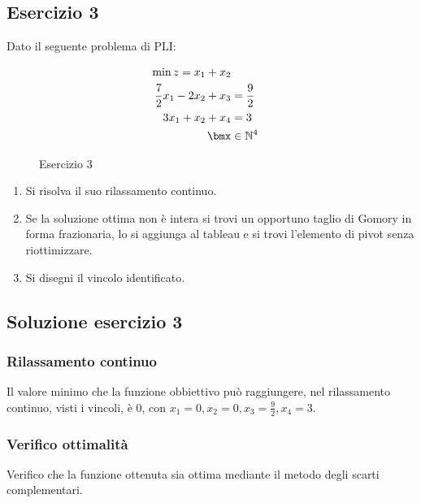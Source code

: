 \documentclass[\main/main.tex]{subfiles}
\begin{document}
\subsection{Esercizio 3}
Dato il seguente problema di PLI:

\begin{figure}
  \begin{align*}
    \min z = x_1 + x_2                             \\
    \frac{7}{2}x_1 - 2x_2 + x_3 & = \frac{9}{2}    \\
    3x_1 + x_2 + x_4            & = 3              \\
    \bmx                        & \in \mathbb{N}^4
  \end{align*}
  \caption{Esercizio 3}
\end{figure}

\begin{enumerate}
  \item Si risolva il suo rilassamento continuo.
  \item Se la soluzione ottima non è intera si trovi un opportuno taglio di Gomory in forma frazionaria, lo si aggiunga al tableau e si trovi l'elemento di pivot senza riottimizzare.
  \item Si disegni il vincolo identificato.
\end{enumerate}

\subsection{Soluzione esercizio 3}
\subsubsection*{Rilassamento continuo}
Il valore minimo che la funzione obbiettivo può raggiungere, nel rilassamento continuo, visti i vincoli, è $0$, con $x_1 = 0, x_2 = 0, x_3 = \frac{9}{2}, x_4 = 3$.

\subsubsection*{Verifico ottimalità}
Verifico che la funzione ottenuta sia ottima mediante il metodo degli scarti complementari.
\end{document}
